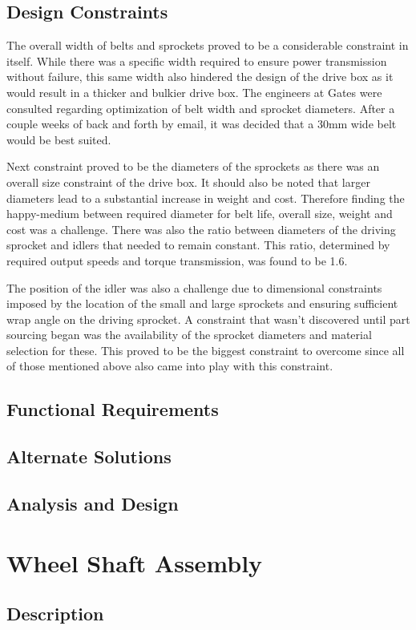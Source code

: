 \subsection{Design Constraints}
The overall width of belts and sprockets proved to be a considerable constraint in itself. While there was a specific width required to ensure power transmission without failure, this same width also hindered the design of the drive box as it would result in a thicker and bulkier drive box. The engineers at Gates were consulted regarding optimization of belt width and sprocket diameters. After a couple weeks of back and forth by email, it was decided that a 30mm wide belt would be best suited.

Next constraint proved to be the diameters of the sprockets as there was an overall size constraint of the drive box. It should also be noted that larger diameters lead to a substantial increase in weight and cost. Therefore finding the happy-medium between required diameter for belt life, overall size, weight and cost was a challenge. There was also the ratio between diameters of the driving sprocket and idlers that needed to remain constant. This ratio, determined by required output speeds and torque transmission, was found to be 1.6.

The position of the idler was also a challenge due to dimensional constraints imposed by the location of the small and large sprockets and ensuring sufficient wrap angle on the driving sprocket. A constraint that wasn’t discovered until part sourcing began was the availability of the sprocket diameters and material selection for these. This proved to be the biggest constraint to overcome since all of those mentioned above also came into play with this constraint.
\subsection{Functional Requirements}
\subsection{Alternate Solutions}
\subsection{Analysis and Design}

\section{Wheel Shaft Assembly}
\subsection{Description}
